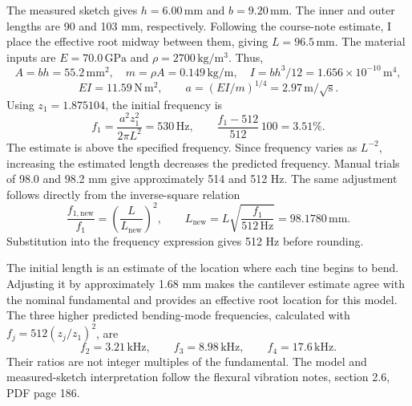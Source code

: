 The measured sketch gives \(h=6.00\,\mathrm{mm}\) and \(b=9.20\,\mathrm{mm}\). The inner and outer lengths are 90 and 103 mm, respectively. Following the course-note estimate, I place the effective root midway between them, giving \(L=96.5\,\mathrm{mm}\). The material inputs are \(E=70.0\,\mathrm{GPa}\) and \(\rho=2700\,\mathrm{kg/m^3}\). Thus,
\[
A=bh=55.2\,\mathrm{mm^2},\quad m=\rho A=0.149\,\mathrm{kg/m},\quad
I=bh^3/12=1.656\times10^{-10}\,\mathrm{m^4},
\]
\[
EI=11.59\,\mathrm{N\,m^2},\qquad a=(EI/m)^{1/4}=2.97\,\mathrm{m/\sqrt{s}}.
\]
Using \(z_1=1.875104\), the initial frequency is
\[
 f_1=\frac{a^2 z_1^2}{2\pi L^2}=530\,\mathrm{Hz},\qquad
 \frac{f_1-512}{512}\,100=3.51\%.
\]
The estimate is above the specified frequency. Since frequency varies as \(L^{-2}\), increasing the estimated length decreases the predicted frequency. Manual trials of 98.0 and 98.2 mm give approximately 514 and 512 Hz. The same adjustment follows directly from the inverse-square relation
\[
\frac{f_{1,\mathrm{new}}}{f_1}=\left(\frac{L}{L_{\mathrm{new}}}\right)^2,\qquad
L_{\mathrm{new}}=L\sqrt{\frac{f_1}{512\,\mathrm{Hz}}}=98.1780\,\mathrm{mm}.
\]
Substitution into the frequency expression gives 512 Hz before rounding.

The initial length is an estimate of the location where each tine begins to bend. Adjusting it by approximately 1.68 mm makes the cantilever estimate agree with the nominal fundamental and provides an effective root location for this model. The three higher predicted bending-mode frequencies, calculated with \(f_j=512(z_j/z_1)^2\), are
\[
 f_2=3.21\,\mathrm{kHz},\qquad f_3=8.98\,\mathrm{kHz},\qquad f_4=17.6\,\mathrm{kHz}.
\]
Their ratios are not integer multiples of the fundamental. The model and measured-sketch interpretation follow the flexural vibration notes, section 2.6, PDF page 186.


